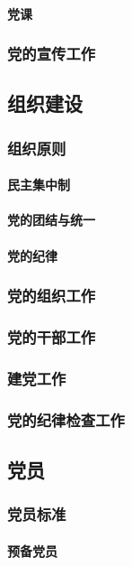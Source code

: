 \documentclass[UTF8]{../RepresentationUniverse}
\begin{document}
            \paragraph{党课}
        \subsubsection{党的宣传工作}

    \subsection{组织建设}
        \subsubsection{组织原则}
            \paragraph{民主集中制}
            \paragraph{党的团结与统一}
            \paragraph{党的纪律}
        \subsubsection{党的组织工作}
        \subsubsection{党的干部工作}
        \subsubsection{建党工作}
        \subsubsection{党的纪律检查工作}

    \subsection{党员}
        \subsubsection{党员标准}
            \paragraph{预备党员}
\end{document}

